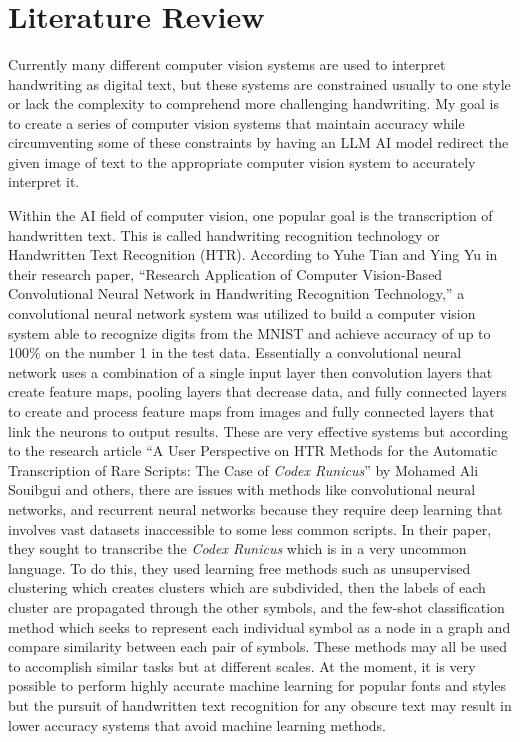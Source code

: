 \documentclass[12pt]{article}
\begin{document}
 

\begin{flushleft} 
 \\ 
 \\ 
 \\ 
\end{flushleft} 
\section{Literature Review}

Currently many different computer vision systems are used to interpret handwriting as digital text, but these systems are constrained usually to one style or lack the complexity to comprehend more challenging handwriting. My goal is to create a series of computer vision systems that maintain accuracy while circumventing some of these constraints by having an LLM AI model redirect the given image of text to the appropriate computer vision system to accurately interpret it. 

Within the AI field of computer vision, one popular goal is the transcription of handwritten text. This is called handwriting recognition technology or Handwritten Text Recognition (HTR). According to Yuhe Tian and Ying Yu in their research paper, “Research Application of Computer Vision-Based Convolutional Neural Network in Handwriting Recognition Technology,” a convolutional neural network system was utilized to build a computer vision system able to recognize digits from the MNIST and achieve accuracy of up to 100\% on the number 1 in the test data. Essentially a convolutional neural network uses a combination of a single input layer then convolution layers that create feature maps, pooling layers that decrease data, and fully connected layers to create and process feature maps from images and fully connected layers that link the neurons to output results. These are very effective systems but according to the research article “A User Perspective on HTR Methods for the Automatic Transcription of Rare Scripts: The Case of \emph{Codex Runicus}” by Mohamed Ali Souibgui and others, there are issues with methods like convolutional neural networks, and recurrent neural networks because they require deep learning that involves vast datasets inaccessible to some less common scripts. In their paper, they sought to transcribe the \emph{Codex Runicus} which is in a very uncommon language. To do this, they used learning free methods such as unsupervised clustering which creates clusters which are subdivided, then the labels of each cluster are propagated through the other symbols, and the few-shot classification method which seeks to represent each individual symbol as a node in a graph and compare similarity between each pair of symbols. These methods may all be used to accomplish similar tasks but at different scales. At the moment, it is very possible to perform highly accurate machine learning for popular fonts and styles but the pursuit of handwritten text recognition for any obscure text may result in lower accuracy systems that avoid machine learning methods.
\end{document}
